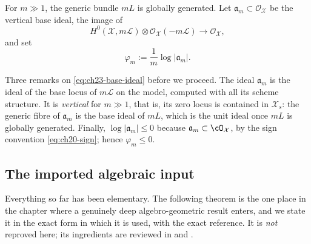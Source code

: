 For \(m\gg1\), the generic bundle \(mL\) is globally generated.  Let
\(\mathfrak a_m\subset\mathcal O_{\mathcal X}\) be the vertical base ideal,
the image of
\begin{equation}\label{eq:ch23-base-ideal}
 H^0(\mathcal X,m\mathcal L)
       \otimes\mathcal O_{\mathcal X}(-m\mathcal L)
 \longrightarrow\mathcal O_{\mathcal X},
\end{equation}
and set
\begin{equation}\label{eq:ch23-base-potential}
                         \varphi_m
                         :=\frac1m\log|\mathfrak a_m|.
\end{equation}

Three remarks on \eqref{eq:ch23-base-ideal} before we proceed.  The ideal
\(\mathfrak a_m\) is the ideal of the base locus of \(m\mathcal L\) on the
model, computed with all its scheme structure.  It is \emph{vertical} for
\(m\gg1\), that is, its zero locus is contained in \(\mathcal X_s\): the
generic fibre of \(\mathfrak a_m\) is the base ideal of \(mL\), which is the
unit ideal once \(mL\) is globally generated.  Finally,
\(\log|\mathfrak a_m|\leq0\) because \(\mathfrak a_m\subset\cO_{\mathcal X}\),
by the sign convention \eqref{eq:ch20-sign}; hence \(\varphi_m\leq0\).

\subsection{The imported algebraic input}
\label{sec:ch23-imported-input}

Everything so far has been elementary.  The following theorem is the one
place in the chapter where a genuinely deep algebro-geometric result enters,
and we state it in the exact form in which it is used, with the exact
reference.  It is \emph{not} reproved here; its ingredients are reviewed in
 and
.

